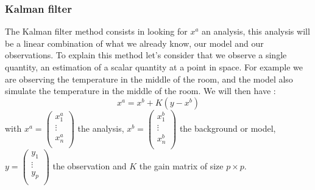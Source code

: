 \subsubsection{Kalman filter}
The Kalman filter method consists in looking for $x^a$ an analysis, this analysis will be a linear combination of what we already know, our model and our observations.
To explain this method let's consider that we observe a single quantity, an estimation of a scalar quantity at a point in space. For example we are observing the temperature in the middle of the room, and the model also simulate the temperature in the middle of the room.  We will then have :
$$x^a=x^b+K(y-x^b)$$
with $x^a=\begin{pmatrix}
 x_1^a  \\ 
 \vdots \\
 x_n^a \\
\end{pmatrix}$ the analysis, $x^b=\begin{pmatrix}
 x_1^b  \\ 
 \vdots \\
 x_n^b \\
 \end{pmatrix}$ the background or model, $y=\begin{pmatrix}
 y_1  \\ 
 \vdots \\
 y_p \\
 \end{pmatrix}$ the observation and $K$ the gain matrix of size $p \times p$. 

